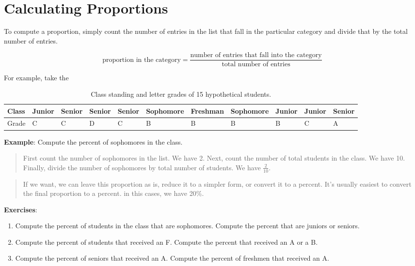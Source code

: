 \documentclass[]{book}
\providecommand{\tightlist}{%
  \setlength{\itemsep}{0pt}\setlength{\parskip}{0pt}}
\theoremstyle{definition}
\theoremstyle{definition}
\theoremstyle{definition}
\theoremstyle{remark}
\begin{document}
\section{Calculating Proportions}\label{calculating-proportions}

To compute a proportion, simply count the number of entries in the list
that fall in the particular category and divide that by the total number
of entries.

\[\text{proportion in the category} = \dfrac{\text{number of entries that fall into the category}}{\text{total number of entries}}\]

For example, take the

\begin{table}

\caption{\label{tab:unnamed-chunk-1}Class standing and letter grades of 15 hypothetical students.}
\centering
\begin{tabular}[t]{l|l|l|l|l|l|l|l|l|l|l}
\hline
Class & Junior & Senior & Senior & Senior & Sophomore & Freshman & Sophomore & Junior & Junior & Senior\\
\hline
Grade & C & C & D & C & B & B & B & B & C & A\\
\hline
\end{tabular}
\end{table}

\textbf{Example}: Compute the percent of sophomores in the class.

\begin{quote}
First count the number of sophomores in the list. We have 2. Next, count
the number of total students in the class. We have 10. Finally, divide
the number of sophomores by total number of students. We have
\(\frac{2}{10}\).
\end{quote}

\begin{quote}
If we want, we can leave this proportion as is, reduce it to a simpler
form, or convert it to a percent. It's usually easiest to convert the
final proportion to a percent. in this cases, we have 20\%.
\end{quote}

\textbf{Exercises}:

\begin{enumerate}
\def\labelenumi{\arabic{enumi}.}
\tightlist
\item
  Compute the percent of students in the class that are sophomores.
  Compute the percent that are juniors or seniors.
\item
  Compute the percent of students that received an F. Compute the
  percent that received an A or a B.
\item
  Compute the percent of seniors that received an A. Compute the percent
  of freshmen that received an A.
\end{enumerate}
\end{document}

